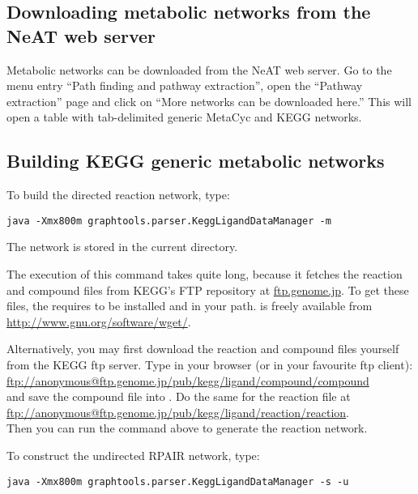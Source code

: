 \subsection{Downloading metabolic networks from the NeAT web server}

Metabolic networks can be downloaded from the NeAT web server.
Go to the menu entry ``Path finding and pathway extraction'', open the
``Pathway extraction'' page and click on ``More networks can be downloaded
here.'' This will open a table with tab-delimited generic MetaCyc and KEGG
networks.

\subsection{Building KEGG generic metabolic networks} 

To build the directed reaction network, type:

\begin{verbatim}
java -Xmx800m graphtools.parser.KeggLigandDataManager -m
\end{verbatim}

The network is stored in the current directory.

The execution of this command takes quite long, because it fetches the reaction
and compound files from KEGG's FTP repository at \url{ftp.genome.jp}. 
To get these files, the  requires
 to be installed and in your path.  is 
freely available from \url{http://www.gnu.org/software/wget/}.

Alternatively, you may first download the reaction and compound files yourself
from the KEGG ftp server. Type in your browser (or in your favourite ftp
client):\\
\url{ftp://anonymous@ftp.genome.jp/pub/kegg/ligand/compound/compound}\\
and save the compound file into \RSAT{}. Do the same
for the reaction file at\\
\url{ftp://anonymous@ftp.genome.jp/pub/kegg/ligand/reaction/reaction}.\\ 
Then you can run the command above to generate the reaction network.

\label{RPAIR}
To construct the undirected RPAIR network, type:

\begin{verbatim}
java -Xmx800m graphtools.parser.KeggLigandDataManager -s -u
\end{verbatim}

